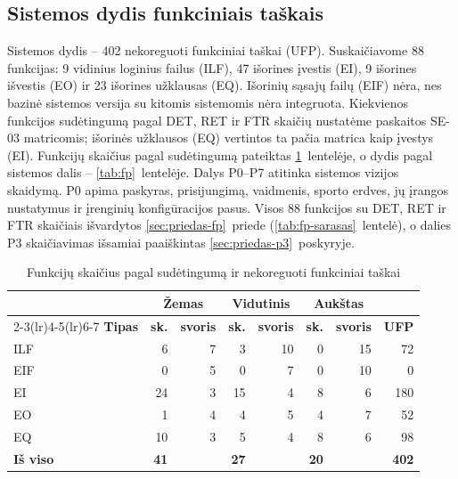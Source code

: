 \subsection{Sistemos dydis funkciniais taškais}

Sistemos dydis – 402 nekoreguoti funkciniai taškai (UFP). Suskaičiavome
88 funkcijas: 9 vidinius loginius failus (ILF), 47 išorines įvestis (EI),
9 išorines išvestis (EO) ir 23 išorines užklausas (EQ). Išorinių sąsajų
failų (EIF) nėra, nes bazinė sistemos versija su kitomis sistemomis
nėra integruota. Kiekvienos funkcijos sudėtingumą pagal DET, RET ir FTR skaičių
nustatėme paskaitos SE-03 matricomis; išorinės užklausos (EQ) vertintos ta
pačia matrica kaip įvestys (EI). Funkcijų skaičius pagal sudėtingumą pateiktas
\ref{tab:fp-sud}~lentelėje, o dydis pagal sistemos dalis –
\ref{tab:fp}~lentelėje. Dalys P0--P7 atitinka sistemos vizijos skaidymą. P0 apima paskyras,
prisijungimą, vaidmenis, sporto erdves, jų įrangos nustatymus ir įrenginių konfigūracijos pasus. Visos
88 funkcijos su DET, RET ir FTR skaičiais išvardytos \ref{sec:priedas-fp}~priede
(\ref{tab:fp-sarasas}~lentelė), o dalies P3 skaičiavimas išsamiai
paaiškintas \ref{sec:priedas-p3}~poskyryje.

\begin{table}[H]
  \centering
  \caption{Funkcijų skaičius pagal sudėtingumą ir nekoreguoti funkciniai taškai}
  \label{tab:fp-sud}
  \small
  \begin{tabular}{@{}lrrrrrrr@{}}
    \toprule
    & \multicolumn{2}{c}{\textbf{Žemas}} & \multicolumn{2}{c}{\textbf{Vidutinis}} & \multicolumn{2}{c}{\textbf{Aukštas}} & \\
    \cmidrule(lr){2-3}\cmidrule(lr){4-5}\cmidrule(lr){6-7}
    \textbf{Tipas} & \textbf{sk.} & \textbf{svoris} & \textbf{sk.} & \textbf{svoris} & \textbf{sk.} & \textbf{svoris} & \textbf{UFP} \\
    \midrule
    ILF & 6 & 7 & 3 & 10 & 0 & 15 & 72 \\
    EIF & 0 & 5 & 0 & 7 & 0 & 10 & 0 \\
    EI & 24 & 3 & 15 & 4 & 8 & 6 & 180 \\
    EO & 1 & 4 & 4 & 5 & 4 & 7 & 52 \\
    EQ & 10 & 3 & 5 & 4 & 8 & 6 & 98 \\
    \midrule
    \textbf{Iš viso} & \textbf{41} & & \textbf{27} & & \textbf{20} & & \textbf{402} \\
    \bottomrule
  \end{tabular}
\end{table}

